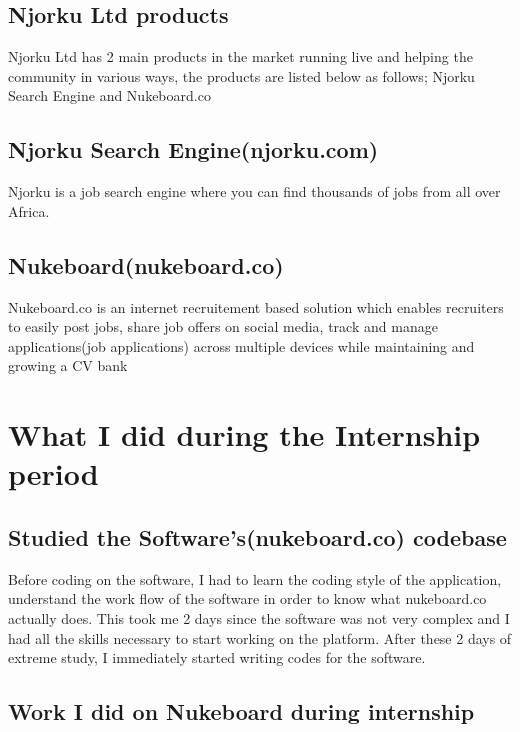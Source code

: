 \subsection{Njorku Ltd products}

Njorku Ltd has 2 main products in the market running live and helping the community in various ways, the products are listed below as follows; Njorku Search Engine and Nukeboard.co

\subsection{Njorku Search Engine(njorku.com)}

Njorku is a job search engine where you can find thousands of jobs from all over Africa.

\subsection{Nukeboard(nukeboard.co)}

Nukeboard.co is an internet recruitement based solution which enables recruiters to easily post jobs, share job offers on social media, track and manage applications(job applications) across multiple devices while maintaining and growing a CV bank


\section{What I did during the Internship period}

\subsection{Studied the Software's(nukeboard.co) codebase}

Before coding on the software, I had to learn the coding style of the application, understand the work flow of the software in order to know what nukeboard.co actually does. This took me 2 days since the software was not very complex and I had all the skills necessary to start working on the platform. After these 2 days of extreme study, I immediately started writing codes for the software.

\subsection{Work I did on Nukeboard during internship}

